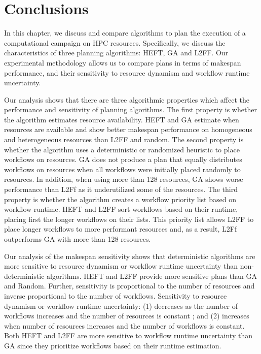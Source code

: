 \section{Conclusions}
\label{sec:cf_algo_sel}

In this chapter, we discuss and compare algorithms to plan the execution of a
computational campaign on HPC resources. Specifically, we discuss the
characteristics of three planning algorithms: HEFT, GA and L2FF. Our
experimental methodology allows us to compare plans in terms of makespan
performance, and their sensitivity to resource dynamism and workflow runtime
uncertainty.

Our analysis shows that there are three algorithmic properties which affect the
performance and sensitivity of planning algorithms. The first property is
whether the algorithm estimates resource availability. HEFT and GA estimate when
resources are available and show better makespan performance on homogeneous and
heterogeneous resources than L2FF and random. The second property is whether the
algorithm uses a deterministic or randomized heuristic to place workflows on
resources. GA does not produce a plan that equally distributes workflows on resources
when all workflows were initially placed randomly to resources. In addition, when 
using more than 128 resources, GA shows worse performance than L2Ff as it 
underutilized some of the resources. The third property is whether the algorithm creates
a workflow priority list based on workflow runtime. HEFT and L2FF sort workflows based
on their runtime, placing first the longer workflows on their lists. This priority list allows
L2FF to place longer workflows to more performant resources and, as a result, L2Ff
outperforms GA with more than 128 resources.

Our analysis of the makespan sensitivity shows that deterministic algorithms are
more sensitive to resource dynamism or workflow runtime uncertainty than
non-deterministic algorithms. HEFT and L2FF provide more sensitive plans than GA
and Random. Further, sensitivity is proportional to the number of resources and
inverse proportional to the number of workflows. Sensitivity to resource
dynamism or workflow runtime uncertainty: (1) decreases as the number of
workflows increases and the number of resources is constant ; and (2) increases
when number of resources increases and the number of workflows is constant. Both
HEFT and L2FF are more sensitive to workflow runtime uncertainty than GA since
they prioritize workflows based on their runtime estimation.

